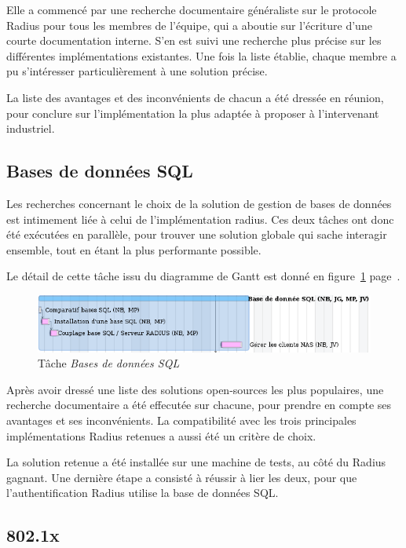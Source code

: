 Elle a commencé par une recherche documentaire généraliste sur le protocole Radius pour tous les membres de l'équipe, qui a aboutie sur l'écriture d'une courte documentation interne. S'en est suivi une recherche plus précise sur les différentes implémentations existantes. Une fois la liste établie, chaque membre a pu s'intéresser particulièrement à une solution précise.

La liste des avantages et des inconvénients de chacun a été dressée en réunion, pour conclure sur l'implémentation la plus adaptée à proposer à l'intervenant industriel.

\subsection{Bases de données SQL}

Les recherches concernant le choix de la solution de gestion de bases de données est intimement liée à celui de l'implémentation radius. Ces deux tâches ont donc été exécutées en parallèle, pour trouver une solution globale qui sache interagir ensemble, tout en étant la plus performante possible.

Le détail de cette tâche issu du diagramme de Gantt est donné en figure~\ref{gantt_sql} page~\pageref{gantt_sql}.

\begin{figure}[!h]
	\label{gantt_sql}
	\begin{center}
		\includegraphics[width=350pt]{img/gantt_sql.png}
	\end{center}
	\caption{Tâche \textit{Bases de données SQL}}
\end{figure}

Après avoir dressé une liste des solutions open-sources les plus populaires, une recherche documentaire a été effecutée sur chacune, pour prendre en compte ses avantages et ses inconvénients. La compatibilité avec les trois principales implémentations Radius retenues a aussi été un critère de choix.

La solution retenue a été installée sur une machine de tests, au côté du Radius gagnant. Une dernière étape a consisté à réussir à lier les deux, pour que l'authentification Radius utilise la base de données SQL.

\subsection{802.1x}

